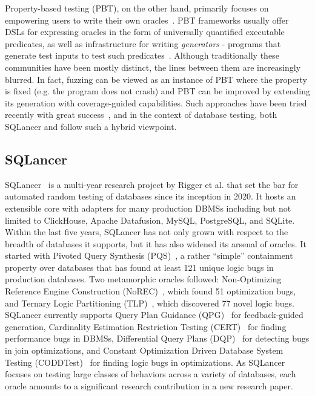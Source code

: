 Property-based testing (PBT), on the other hand, primarily focuses on empowering users
to write their own oracles~\cite{quickcheck, htsi}. PBT frameworks usually offer DSLs
for expressing oracles in the form of universally quantified executable predicates, as
well as infrastructure for writing {\em generators} - programs that generate test
inputs to test such predicates~\cite{quickcheck, generatinggenerators}. Although
traditionally these communities have been mostly distinct, the lines between them are
increasingly blurred. In fact, fuzzing can be viewed as an instance of PBT where the
property is fixed (e.g. the program does not crash) and PBT can be improved by
extending its generation with coverage-guided capabilities. Such approaches have been
tried recently with great success~\cite{FuzzChick, Zest}, and in the context of
database testing, both SQLancer and \tool{} follow such a hybrid viewpoint.

\subsection{SQLancer} \label{dirt:subsec:slancer}

SQLancer~\cite{SQLancer} is a multi-year research project by Rigger et al. that set the
bar for automated random testing of databases since its inception in 2020. It hosts an
extensible core with adapters for many production DBMSs including but not limited to
ClickHouse, Apache Datafusion, MySQL, PostgreSQL, and SQLite. Within the last five
years, SQLancer has not only grown with respect to the breadth of databases it
supports, but it has also widened its arsenal of oracles. It started with Pivoted Query
Synthesis (PQS)~\cite{rigger.pqs}, a rather ``simple'' containment property over
databases that has found at least 121 unique logic bugs in production databases. Two
metamorphic oracles followed: Non-Optimizing Reference Engine Construction
(NoREC)~\cite{rigger.norec}, which found 51 optimization bugs, and Ternary Logic
Partitioning (TLP)~\cite{rigger.tlp}, which discovered 77 novel logic bugs. SQLancer
currently supports Query Plan Guidance (QPG)~\cite{rigger.qpg} for feedback-guided
generation, Cardinality Estimation Restriction Testing (CERT)~\cite{rigger.cert} for
finding performance bugs in DBMSs, Differential Query Plans (DQP)~\cite{rigger.dqp} for
detecting bugs in join optimizations, and Constant Optimization Driven Database System
Testing (CODDTest)~\cite{rigger.coddtest} for finding logic bugs in optimizations. As
SQLancer focuses on testing large classes of behaviors across a variety of databases,
each oracle amounts to a significant research contribution in a new research paper.

